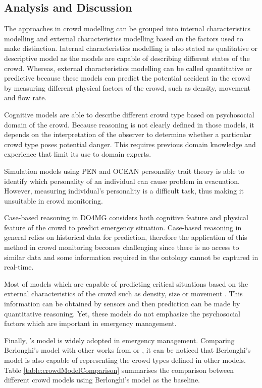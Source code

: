 \subsection{Analysis and Discussion}

The approaches in crowd modelling can be grouped into internal characteristics modelling and external characteristics modelling based on the factors used to make distinction. Internal characteristics modelling is also stated as qualitative or descriptive model \citep{Petty2004} as the models are capable of describing different states of the crowd. Whereas, external characteristics modelling can be called quantitative or predictive because these models can predict the potential accident in the crowd by measuring different physical factors of the crowd, such as density, movement and flow rate.

Cognitive models \citep{Blumer1951,Lofland1985,Momboisse1967} are able to describe different crowd type based on psychosocial domain of the crowd. Because reasoning is not clearly defined in those models, it depends on the interpretation of the observer to determine whether a particular crowd type poses potential danger. This requires previous domain knowledge and experience that limit its use to domain experts.

Simulation models using PEN \citep{Guy2011} and OCEAN \citep{Durupinar2008} personality trait theory is able to identify which personality of an individual can cause problem in evacuation. However, measuring individual’s personality is a difficult task, thus making it unsuitable in crowd monitoring.

Case-based reasoning in DO4MG \citep{DelirHaghighi2013a} considers both cognitive feature and physical feature of the crowd to predict emergency situation. Case-based reasoning in general relies on historical data for prediction, therefore the application of this method in crowd monitoring becomes challenging since there is no access to similar data and some information required in the ontology cannot be captured in real-time.

Most of models which are capable of predicting critical situations based on the external characteristics of the crowd such as density, size or movement \citep{Helbing2007,Lee2005}. This information can be obtained by sensors and then prediction can be made by quantitative reasoning. Yet, these models do not emphasize the psychosocial factors which are important in emergency management.

Finally, \citet{Berlonghi1995}’s model is widely adopted in emergency management. Comparing Berlonghi's model with other works from \citet{Blumer1951} or \citet{Momboisse1967}, it can be noticed that Berlonghi's model is also capable of representing the crowd types defined in other models. Table \ref{table:crowdModelComparison} summarises the comparison between different crowd models using Berlonghi's model as the baseline.

